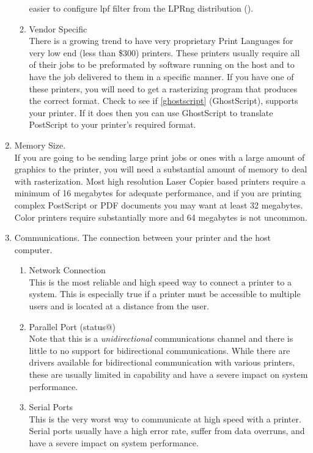 \documentclass[a4paper]{article}
\begin{document}
\begin{enumerate}
\begin{enumerate}
easier to configure {\ttfamily lpf} filter from the LPRng distribution
().
\item Vendor Specific\\ 
There is a growing trend to have very proprietary Print Languages
for very low end  (less than \$300) printers.
These printers usually require all of their jobs to be preformated by
software running on the host and to have the job delivered to them
in a specific manner.
If you have one of these printers,
you will need to get a rasterizing program that produces the correct format.
Check to see if
\ref{ghostscript} {(GhostScript)},
supports your printer.
If it does then you can use {\ttfamily GhostScript} to translate
PostScript to your printer's required format.
\end{enumerate}
\item Memory Size.\\ 
If you are going to be sending large print jobs or ones with a large
amount of graphics to the printer, you will need a substantial amount
of memory to deal with rasterization.
Most high resolution Laser Copier based printers require a minimum of
16 megabytes for adequate performance,
and if you are printing complex PostScript or PDF documents you
may want at least 32 megabytes.
Color printers require substantially more and 64 megabytes is not uncommon.
\item Communications.
The connection between your printer
and the host computer.
\begin{enumerate}
\item Network Connection\\ 
This is the most reliable and high speed way to connect a printer
to a system.
This is especially true if a printer must be accessible to multiple
users and is located at a distance from the user.
\item Parallel Port ({\ttfamily status@})\\ 
Note that this is a {\itshape unidirectional\/} communications channel
and there is little to no support for bidirectional communications.
While there are drivers available for bidirectional communication with 
various printers,
these are usually limited in capability and have a severe impact on
system performance.
\item Serial Ports\\ 
This is the very worst way to communicate at high speed with a printer.
Serial ports usually have a high error rate,
suffer from data overruns,
and have a severe impact on system performance.

\end{enumerate}
\end{enumerate}
\end{document}
